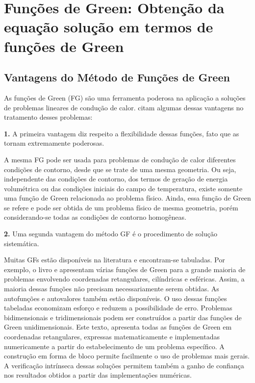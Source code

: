 \chapter[Funções de Green]{Funções de Green: Obtenção da equação solução em termos de funções de Green}\label{FG}

\section{Vantagens do Método de Funções de Green}
As funções de Green (FG) são uma ferramenta poderosa na aplicação a soluções de problemas lineares de condução de calor. \textcite{beck2010} citam algumas dessas vantagens no tratamento desses problemas:

\textbf{1.} A primeira vantagem diz respeito a flexibilidade dessas funções, fato que as tornam extremamente poderosas.

A mesma FG pode ser usada para problemas de condução de calor diferentes condições de contorno, desde que se trate de uma mesma geometria. Ou seja, independente das condições de contorno, dos termos de geração de energia volumétrica ou das condições iniciais do campo de temperatura, existe somente uma função de Green relacionada ao problema físico. Ainda, essa função de Green se refere e pode ser obtida de um problema físico de mesma geometria, porém considerando-se todas as condições de contorno homogêneas.

\textbf{2.} Uma segunda vantagem do método GF é o procedimento de solução sistemática.

Muitas GFs estão disponíveis na literatura e encontram-se tabuladas. Por exemplo, o livro  \textcite{beck1993} e \textcite{beck2010} apresentam várias funções de Green para a grande maioria de problemas envolvendo coordenadas retangulares, cilíndricas e esféricas. Assim, a maioria dessas funções não precisam necessariamente serem obtidas. As autofunções e autovalores também estão disponíveis. O uso dessas funções tabeladas economizam esforço e reduzem a possibilidade de erro. Problemas bidimensionais e tridimensionais podem ser construídos a partir das funções de Green unidimensionais. Este texto, apresenta todas as funções de Green em coordenadas retangulares, expressas matematicamente e implementadas numericamente a partir do estabelecimento de um problema específico. A construção em forma de bloco permite facilmente o uso de problemas mais gerais. A verificação intrínseca dessas soluções permitem também a ganho de confiança nos resultados obtidos a partir das implementações numéricas.

